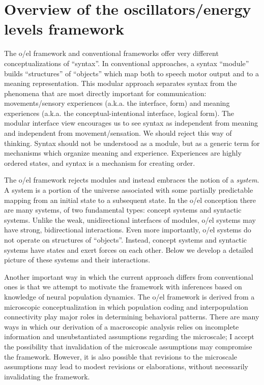 \chapter{Overview of the oscillators/energy levels framework}
The o/el framework and conventional frameworks offer very different conceptualizations of “syntax”. In conventional approaches, a syntax “module” builds “structures” of “objects” which map both to speech motor output and to a meaning representation. This modular approach separates syntax from the phenomena that are most directly important for communication: movements/sensory experiences (a.k.a. the  interface,  form) and meaning experiences (a.k.a. the conceptual-intentional interface, logical form). The modular interface view encourages us to see syntax as independent from meaning and independent from movement/sensation. We should reject this way of thinking. Syntax should not be understood as a module, but as a generic term for mechanisms which organize meaning and  experience. Experiences are highly ordered states, and syntax is a mechanism for creating order. 

  The o/el framework rejects modules and instead embraces the notion of a \textit{system}. A system is a portion of the universe associated with some partially predictable mapping from an initial state to a subsequent state. In the o/el conception there are many systems, of two fundamental types: concept systems and syntactic systems. Unlike the weak, unidirectional interfaces of modules, o/el systems may have strong, bidirectional interactions. Even more importantly, o/el systems do not operate on structures of “objects”. Instead, concept systems and syntactic systems have states and exert forces on each other. Below we develop a detailed picture of these systems and their interactions. 

  Another important way in which the current approach differs from conventional ones is that we attempt to motivate the framework with inferences based on knowledge of neural population dynamics. The o/el framework is derived from a microscopic conceptualization in which population coding and interpopulation connectivity play major roles in determining behavioral patterns. There are many ways in which our derivation of a macroscopic analysis relies on incomplete information and unsubstantiated assumptions regarding the microscale; I accept the possibility that invalidation of the microscale assumptions may compromise the framework. However, it is also possible that revisions to the microscale assumptions may lead to modest revisions or elaborations, without necessarily invalidating the framework.

